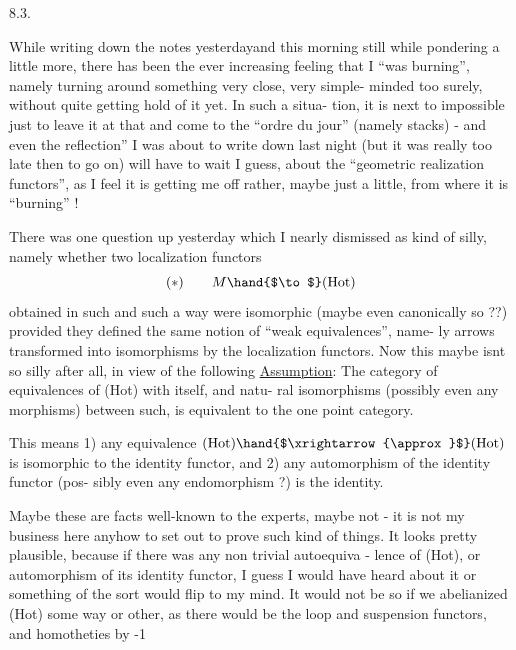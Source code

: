 
8.3.

 While writing down the notes yesterday\hand{,}and this morning still while
pondering a little more, there has been the ever increasing feeling that
I ``was burning'', namely turning around something very close, very simple-%
minded too surely, without quite getting hold of it yet. In such a situa-%
tion, it is next to impossible just to leave it at that and come to the
``ordre du jour'' (namely stacks) - and even the  reflection'' I was about
to write down last night (but it was really too late then to go on) will
have to wait I guess, about the ``geometric realization functors'', as I
feel it is getting me off rather, maybe just a little, from where it is
``burning'' !

There was one question  up yesterday  which I nearly
dismissed as kind of silly, namely whether two localization functors
\[ (*) \qquad M \hand{$\to$} (\mathrm{Hot}) \]
obtained in such and such a way were isomorphic (maybe even canonically
so ??) provided they defined the same notion of ``weak equivalences'', name-%
ly arrows transformed into isomorphisms by the localization functors. Now
this maybe isnt so silly after all, in view of the following
\uline{Assumption}: The category of equivalences of (Hot) with itself, and  natu-%
ral isomorphisms (possibly even any morphisms) between such, is equivalent
to the one point category.

This means 1) any equivalence $(\mathrm{Hot})\hand{$\xrightarrow{\approx}$}(\mathrm{Hot})$ is isomorphic to the
identity functor, and 2) any automorphism of the identity functor (pos-%
sibly even any endomorphism ?) is the identity.

Maybe these are facts well-known to the experts, maybe not - it is
not my business here anyhow to set out to prove such kind of things. It
looks pretty plausible, because if there was any non trivial autoequiva -
lence of (Hot), or automorphism of its identity functor, I guess I would
have heard about it\hand{,} or something of the sort would flip to my mind. It
would not be so if we abelianized (Hot) some way or other, as there would
be the loop and suspension functors, and homotheties by -1  

